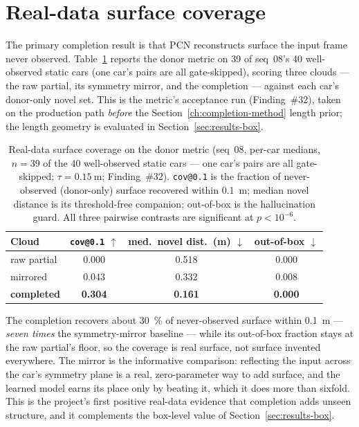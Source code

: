 \section{Real-data surface coverage}
\label{sec:results-coverage}

The primary completion result is that PCN reconstructs surface the input frame
never observed. Table~\ref{tab:donor-coverage} reports the donor metric on \num{39} of seq~08's
\num{40} well-observed static cars (one car's pairs are all gate-skipped), scoring
three clouds --- the raw partial, its symmetry mirror, and the completion ---
against each car's
donor-only novel set. This is the metric's acceptance run (Finding~\#32), taken
on the production path \emph{before} the Section~\ref{ch:completion-method} length prior; the length
geometry is evaluated in Section~\ref{sec:results-box}.

\begin{table}[H]
  \centering
  \caption{Real-data surface coverage on the donor metric (seq~08, per-car
    medians, $n=39$ of the \num{40} well-observed static cars --- one car's pairs
    are all gate-skipped; $\tau=\SI{0.15}{\meter}$;
    Finding~\#32). \texttt{cov@0.1} is the fraction of never-observed (donor-only)
    surface recovered within \SI{0.1}{\meter}; median novel distance is its
    threshold-free companion; out-of-box is the hallucination guard. All three
    pairwise contrasts are significant at $p<10^{-6}$.}
  \label{tab:donor-coverage}
  \begin{tabular}{lccc}
    \toprule
    Cloud & \texttt{cov@0.1} $\uparrow$ & med.\ novel dist.\ (m) $\downarrow$ & out-of-box $\downarrow$ \\
    \midrule
    raw partial       & 0.000          & 0.518          & 0.000 \\
    mirrored          & 0.043          & 0.332          & 0.008 \\
    \textbf{completed} & \textbf{0.304} & \textbf{0.161} & \textbf{0.000} \\
    \bottomrule
  \end{tabular}
\end{table}

The completion recovers about \SI{30}{\percent} of never-observed surface within
\SI{0.1}{\meter} --- \emph{seven times} the symmetry-mirror baseline --- while its
out-of-box fraction stays at the raw partial's floor, so the coverage is real
surface, not surface invented everywhere. The mirror is the informative
comparison: reflecting the input across the car's symmetry plane is a real,
zero-parameter way to add surface, and the learned model earns its place only by
beating it, which it does more than sixfold. This is the project's first positive
real-data evidence that completion adds unseen structure, and it complements the
box-level value of Section~\ref{sec:results-box}.

